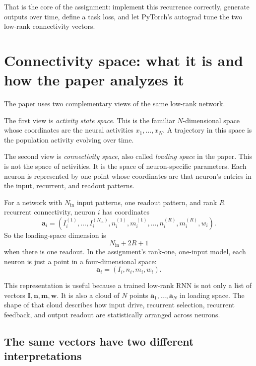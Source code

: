 \documentclass[11pt]{article}
\newcommand{\vm}{\mathbf{m}}
\newcommand{\vn}{\mathbf{n}}
\newcommand{\vI}{\mathbf{I}}
\newcommand{\vw}{\mathbf{w}}
\begin{document}
That is the core of the assignment: implement this recurrence correctly,
generate outputs over time, define a task loss, and let PyTorch's autograd tune
the two low-rank connectivity vectors.

\section{Connectivity space: what it is and how the paper analyzes it}

The paper uses two complementary views of the same low-rank network.

The first view is \emph{activity state space}. This is the familiar
$N$-dimensional space whose coordinates are the neural activities
$x_1,\ldots,x_N$. A trajectory in this space is the population activity evolving
over time.

The second view is \emph{connectivity space}, also called \emph{loading space}
in the paper. This is not the space of activities. It is the space of
neuron-specific parameters. Each neuron is represented by one point whose
coordinates are that neuron's entries in the input, recurrent, and readout
patterns.

For a network with $N_{\mathrm{in}}$ input patterns, one readout pattern, and
rank $R$ recurrent connectivity, neuron $i$ has coordinates
\begin{equation}
  \mathbf{a}_i
  =
  \left(
    I_i^{(1)},\ldots,I_i^{(N_{\mathrm{in}})},
    n_i^{(1)},m_i^{(1)},\ldots,n_i^{(R)},m_i^{(R)},
    w_i
  \right).
  \label{eq:loading_vector_general}
\end{equation}
So the loading-space dimension is
\[
  N_{\mathrm{in}} + 2R + 1
\]
when there is one readout. In the assignment's rank-one, one-input model, each
neuron is just a point in a four-dimensional space:
\begin{equation}
  \mathbf{a}_i = (I_i,n_i,m_i,w_i).
  \label{eq:loading_vector_rank_one}
\end{equation}

This representation is useful because a trained low-rank RNN is not only a list
of vectors $\vI,\vn,\vm,\vw$. It is also a cloud of $N$ points
$\mathbf{a}_1,\ldots,\mathbf{a}_N$ in loading space. The shape of that cloud
describes how input drive, recurrent selection, recurrent feedback, and output
readout are statistically arranged across neurons.

\subsection{The same vectors have two different interpretations}
\end{document}

